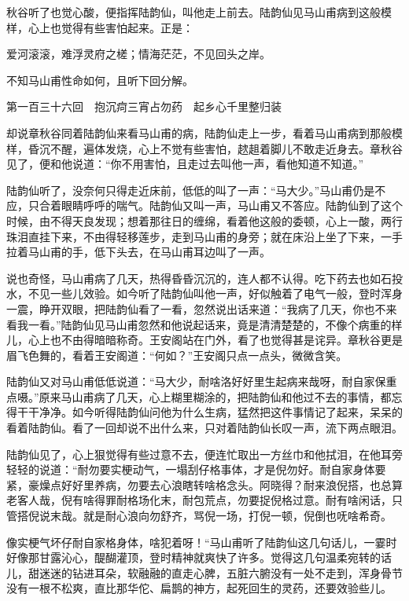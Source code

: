 \documentclass[12pt,UTF8]{ctexbook}
\begin{document}
{{{秋谷听了也觉心酸，便指挥陆韵仙，叫他走上前去。陆韵仙见马山甫病到这般模样，心上也觉得有些害怕起来。正是：

爱河滚滚，难浮灵府之槎；情海茫茫，不见回头之岸。

不知马山甫性命如何，且听下回分解。





第一百三十六回　抱沉疴三宵占勿药　起乡心千里整归装





却说章秋谷同着陆韵仙来看马山甫的病，陆韵仙走上一步，看着马山甫病到那般模样，昏沉不醒，遍体发烧，心上不觉有些害怕，趑趄着脚儿不敢走近身去。章秋谷见了，便和他说道：“你不用害怕，且走过去叫他一声，看他知道不知道。”

陆韵仙听了，没奈何只得走近床前，低低的叫了一声：“马大少。”马山甫仍是不应，只合着眼睛呼呼的喘气。陆韵仙又叫一声，马山甫又不答应。陆韵仙到了这个时候，由不得天良发现；想着那往日的缠绵，看着他这般的委顿，心上一酸，两行珠泪直挂下来，不由得轻移莲步，走到马山甫的身旁；就在床沿上坐了下来，一手拉着马山甫的手，低下头去，在马山甫耳边叫了一声。

说也奇怪，马山甫病了几天，热得昏昏沉沉的，连人都不认得。吃下药去也如石投水，不见一些儿效验。如今听了陆韵仙叫他一声，好似触着了电气一般，登时浑身一震，睁开双眼，把陆韵仙看了一看，忽然说出话来道：“我病了几天，你也不来看我一看。”陆韵仙见马山甫忽然和他说起话来，竟是清清楚楚的，不像个病重的样儿，心上也不由得暗暗称奇。王安阁站在门外，看了也觉得甚是诧异。章秋谷更是眉飞色舞的，看着王安阁道：“何如？”王安阁只点一点头，微微含笑。

陆韵仙又对马山甫低低说道：“马大少，耐啥洛好好里生起病来哉呀，耐自家保重点嗫。”原来马山甫病了几天，心上糊里糊涂的，把陆韵仙和他过不去的事情，都忘得干干净净。如今听得陆韵仙问他为什么生病，猛然把这件事情记了起来，呆呆的看着陆韵仙。看了一回却说不出什么来，只对着陆韵仙长叹一声，流下两点眼泪。

陆韵仙见了，心上狠觉得有些过意不去，便连忙取出一方丝巾和他拭泪，在他耳旁轻轻的说道：“耐勿要实梗动气，一塌刮仔格事体，才是倪勿好。耐自家身体要紧，豪燥点好好里养病，勿要去心浪瞎转啥格念头。阿晓得？耐来浪倪搭，也总算老客人哉，倪有啥得罪耐格场化末，耐包荒点，勿要捉倪格过意。耐有啥闲话，只管搭倪说末哉。就是耐心浪向勿舒齐，骂倪一场，打倪一顿，倪倒也呒啥希奇。

像实梗气坏仔耐自家格身体，啥犯着呀！“马山甫听了陆韵仙这几句话儿，一霎时好像那甘露沁心，醍醐灌顶，登时精神就爽快了许多。觉得这几句温柔宛转的话儿，甜迷迷的钻进耳朵，软融融的直走心脾，五脏六腑没有一处不走到，浑身骨节没有一根不松爽，直比那华佗、扁鹊的神方，起死回生的灵药，还要效验些儿。

}}}
\end{document}
